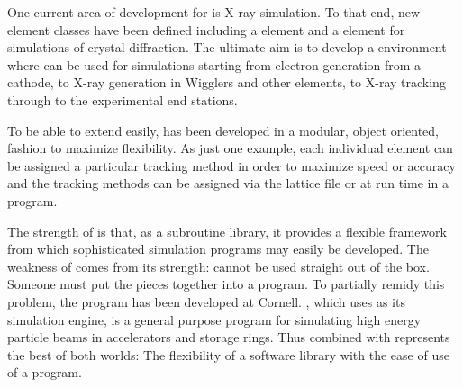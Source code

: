 One current area of development for \bmad is X-ray simulation. To that
end, new element classes have been defined including a 
element and a  element for simulations of crystal
diffraction. The ultimate aim is to develop a environment where \bmad
can be used for simulations starting from electron generation from a
cathode, to X-ray generation in Wigglers and other elements, to X-ray
tracking through to the experimental end stations.

To be able to extend \bmad easily, \bmad has been developed in a
modular, object oriented, fashion to maximize flexibility. As just one
example, each individual element can be assigned a particular tracking
method in order to maximize speed or accuracy and the tracking methods
can be assigned via the lattice file or at run time in a program.

The strength of \bmad is that, as a subroutine library, it provides a
flexible framework from which sophisticated simulation programs may
easily be developed.  The weakness of \bmad comes from its strength:
\bmad cannot be used straight out of the box. Someone must put the
pieces together into a program. To partially remidy this problem, the
\tao program\cite{b:tao} has been developed at Cornell. \tao, which uses
\bmad as its simulation engine, is a general purpose program for
simulating high energy particle beams in accelerators and storage rings.
Thus \bmad combined with \tao represents the best of both worlds: The
flexibility of a software library with the ease of use of a program.

\vfill
\break
